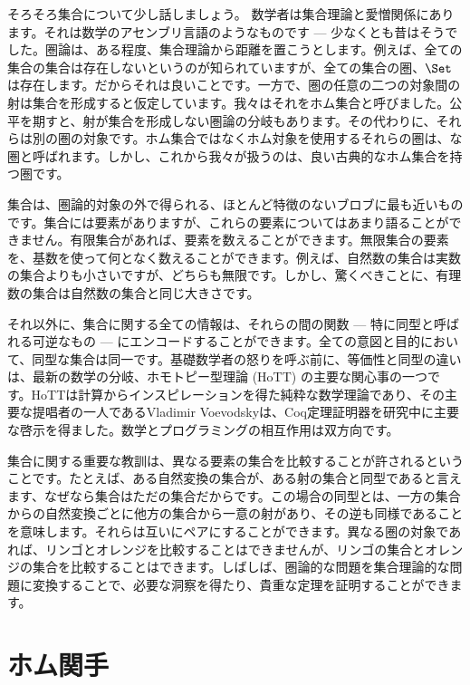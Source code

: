 
\lettrine[lhang=0.17]{そ}{ろそろ}集合について少し話しましょう。
数学者は集合理論と愛憎関係にあります。それは数学のアセンブリ言語のようなものです --- 少なくとも昔はそうでした。圏論は、ある程度、集合理論から距離を置こうとします。例えば、全ての集合の集合は存在しないというのが知られていますが、全ての集合の圏、$\Set$は存在します。だからそれは良いことです。一方で、圏の任意の二つの対象間の射は集合を形成すると仮定しています。我々はそれをホム集合と呼びました。公平を期すと、射が集合を形成しない圏論の分岐もあります。その代わりに、それらは別の圏の対象です。ホム集合ではなくホム対象を使用するそれらの圏は、な圏と呼ばれます。しかし、これから我々が扱うのは、良い古典的なホム集合を持つ圏です。

集合は、圏論的対象の外で得られる、ほとんど特徴のないブロブに最も近いものです。集合には要素がありますが、これらの要素についてはあまり語ることができません。有限集合があれば、要素を数えることができます。無限集合の要素を、基数を使って何となく数えることができます。例えば、自然数の集合は実数の集合よりも小さいですが、どちらも無限です。しかし、驚くべきことに、有理数の集合は自然数の集合と同じ大きさです。

それ以外に、集合に関する全ての情報は、それらの間の関数 --- 特に同型と呼ばれる可逆なもの --- にエンコードすることができます。全ての意図と目的において、同型な集合は同一です。基礎数学者の怒りを呼ぶ前に、等価性と同型の違いは、最新の数学の分岐、ホモトピー型理論 (HoTT) の主要な関心事の一つです。HoTTは計算からインスピレーションを得た純粋な数学理論であり、その主要な提唱者の一人であるVladimir Voevodskyは、Coq定理証明器を研究中に主要な啓示を得ました。数学とプログラミングの相互作用は双方向です。

集合に関する重要な教訓は、異なる要素の集合を比較することが許されるということです。たとえば、ある自然変換の集合が、ある射の集合と同型であると言えます、なぜなら集合はただの集合だからです。この場合の同型とは、一方の集合からの自然変換ごとに他方の集合から一意の射があり、その逆も同様であることを意味します。それらは互いにペアにすることができます。異なる圏の対象であれば、リンゴとオレンジを比較することはできませんが、リンゴの集合とオレンジの集合を比較することはできます。しばしば、圏論的な問題を集合理論的な問題に変換することで、必要な洞察を得たり、貴重な定理を証明することができます。

\section{ホム関手}

